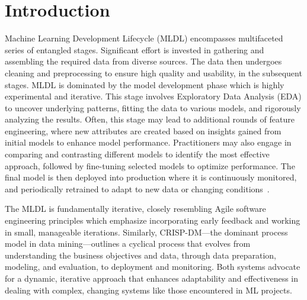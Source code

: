 \section{Introduction}

Machine Learning Development Lifecycle (MLDL) encompasses multifaceted series of entangled stages. Significant effort is invested in gathering and assembling the required data from diverse sources. The data then undergoes cleaning and preprocessing to ensure high quality and usability, in the subsequent stages. MLDL is dominated by the model development phase which is highly experimental and iterative. This stage involves Exploratory Data Analysis (EDA) to uncover underlying patterns, fitting the data to various models, and rigorously analyzing the results. Often, this stage may lead to additional rounds of feature engineering, where new attributes are created based on insights gained from initial models to enhance model performance. Practitioners may also engage in comparing and contrasting different models to identify the most effective approach, followed by fine-tuning selected models to optimize performance. The final model is then deployed into production where it is continuously monitored, and periodically retrained to adapt to new data or changing conditions~\cite{haakman2021ai,amershi2019software,sculley2015hidden}.



The MLDL is fundamentally iterative, closely resembling Agile software engineering principles which emphasize incorporating early feedback and working in small, manageable iterations.
Similarly, CRISP-DM---the dominant process model in data mining---outlines a cyclical process that evolves from understanding the business objectives and data, through data preparation, modeling, and evaluation, to deployment and monitoring. Both systems advocate for a dynamic, iterative approach that enhances adaptability and effectiveness in dealing with complex, changing systems like those encountered in ML projects.

